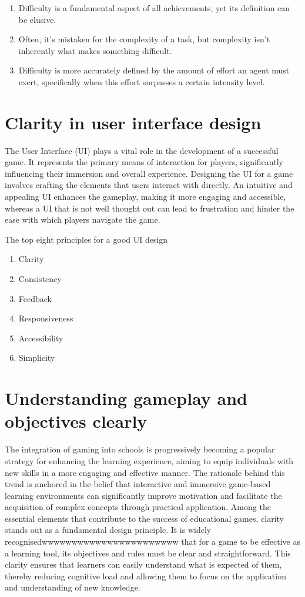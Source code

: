 \documentclass{article}
\begin{document}
\begin{enumerate}
    \item Difficulty is a fundamental aspect of all achievements, yet its definition can be elusive. 
    \item Often, it's mistaken for the complexity of a task, but complexity isn't inherently what makes something difficult.
    \item Difficulty is more accurately defined by the amount of effort an agent must exert, specifically when this effort surpasses a certain intensity level. 
\end{enumerate}

\section{Clarity in user interface design}
The User Interface (UI) plays a vital role in the development of a successful game. It represents the primary means of interaction for players, significantly influencing their immersion and overall experience. Designing the UI for a game involves crafting the elements that users interact with directly. An intuitive and appealing UI enhances the gameplay, making it more engaging and accessible, whereas a UI that is not well thought out can lead to frustration and hinder the ease with which players navigate the game.


The top eight principles for a good UI design
\begin{enumerate}
    \item Clarity
    \item Consistency
    \item Feedback
    \item Responsiveness
    \item Accessibility
    \item Simplicity 
\end{enumerate} 

\section{Understanding gameplay and objectives clearly}

The integration of gaming into schools is progressively becoming a popular strategy for enhancing the learning experience, aiming to equip individuals with new skills in a more engaging and effective manner. The rationale behind this trend is anchored in the belief that interactive and immersive game-based learning environments can significantly improve motivation and facilitate the acquisition of complex concepts through practical application. Among the essential elements that contribute to the success of educational games, clarity stands out as a fundamental design principle. It is widely recognisedwwwwwwwwwwwwwwwwwwwwwww that for a game to be effective as a learning tool, its objectives and rules must be clear and straightforward. This clarity ensures that learners can easily understand what is expected of them, thereby reducing cognitive load and allowing them to focus on the application and understanding of new knowledge.
\end{document}
